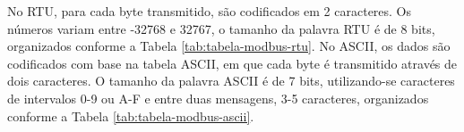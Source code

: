         No \gls{RTU}, para cada byte transmitido, são codificados em 2 caracteres. Os números variam entre -32768 e 32767, o tamanho da palavra RTU é de 8 bits, organizados conforme a Tabela \ref{tab:tabela-modbus-rtu}. No \gls{ASCII}, os dados são codificados com base na tabela \gls{ASCII}, em que cada byte é transmitido através de dois caracteres. O tamanho da palavra ASCII é de 7 bits, utilizando-se caracteres de intervalos 0-9 ou A-F e entre duas mensagens, 3-5 caracteres, organizados conforme a Tabela \ref{tab:tabela-modbus-ascii}.
        
        \begin{table}[h!]	
        	\centering
        \end{table}
        
        \begin{table}[h!]	
        	\centering
        \end{table}
        
        \begin{figure}[!h]
	    \end{figure}
	    
